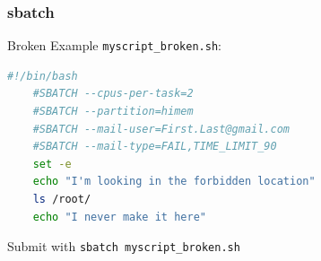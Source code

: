 \documentclass{beamer}
\newcommand{\code}[1]{\colorbox{codegray}{\texttt{#1}}}
\begin{document}







\begin{frame}[fragile]
\frametitle{sbatch}
Broken Example \code{myscript\_broken.sh}: 
\begin{lstlisting}[backgroundcolor = \color{codegray}, language = Bash,showstringspaces=false]
    #!/bin/bash
    #SBATCH --cpus-per-task=2
    #SBATCH --partition=himem
    #SBATCH --mail-user=First.Last@gmail.com
    #SBATCH --mail-type=FAIL,TIME_LIMIT_90
    set -e
    echo "I'm looking in the forbidden location"
    ls /root/
    echo "I never make it here"
\end{lstlisting}
\bigskip
\bigskip
Submit with \code{sbatch myscript\_broken.sh}
\end{frame}
\end{document}
